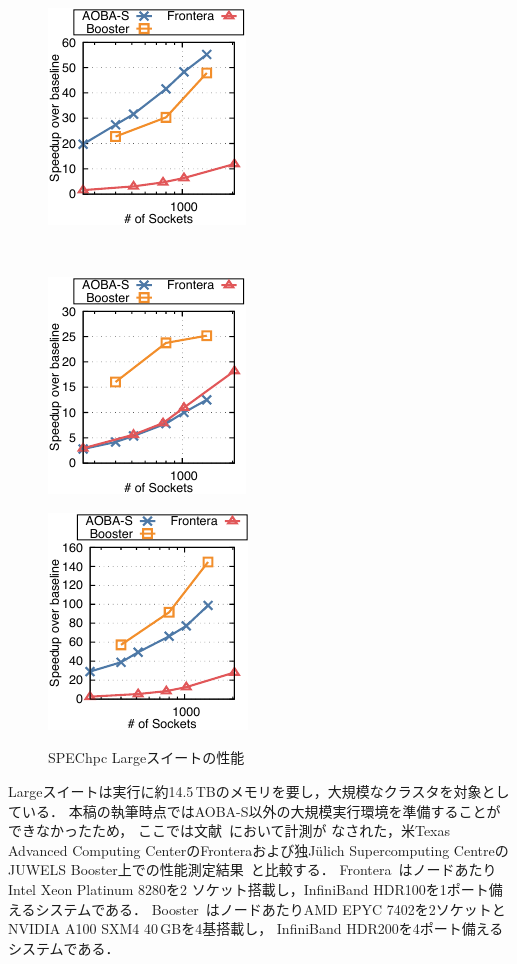 ﻿\documentclass[submit,techrep,noauthor]{ipsj}
\begin{document}
\begin{figure}[tb]
\begin{minipage}[b]{0.46\hsize}
    \centering
    \includegraphics{figs/spechpc_pot3d_l.pdf}
    \label{fig:pot3d-l}
  \end{minipage} \\
  \begin{minipage}[b]{0.46\hsize}
    \centering
    \includegraphics{figs/spechpc_hpgmgfv_l.pdf}
    \label{fig:hpgmg-l}
  \end{minipage}
  \begin{minipage}[b]{0.46\hsize}
    \centering
    \includegraphics{figs/spechpc_weather_l.pdf}
    \label{fig:weather-l}
  \end{minipage}
  \caption{SPEChpc Largeスイートの性能}\label{fig:spechpc-l}
\end{figure}

Largeスイートは実行に約14.5\,TBのメモリを要し，大規模なクラスタを対象としている．
本稿の執筆時点ではAOBA-S以外の大規模実行環境を準備することができなかったため，
ここでは文献~\cite{Brunst2022}において計測が
なされた，米Texas Advanced Computing CenterのFronteraおよび独J\"{u}lich Supercomputing Centreの
JUWELS Booster上での性能測定結果~\cite{Brunst2021}と比較する．
Frontera~\cite{Stanzione2020}はノードあたりIntel Xeon Platinum 8280を2
ソケット搭載し，InfiniBand HDR100を1ポート備えるシステムである．
Booster~\cite{Kesselheim2021}はノードあたりAMD EPYC 7402を2ソケットとNVIDIA A100 SXM4 40\,GBを4基搭載し，
InfiniBand HDR200を4ポート備えるシステムである．
\end{document}
